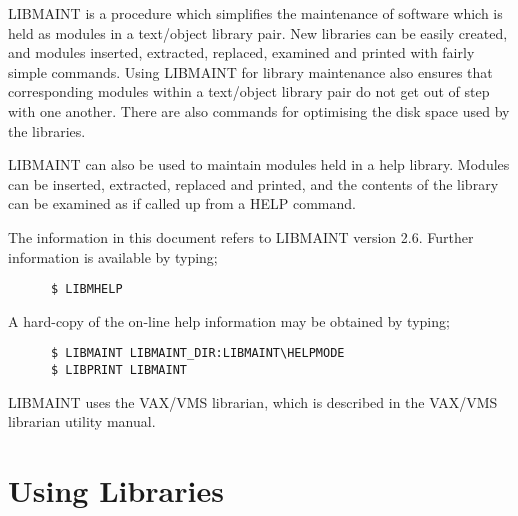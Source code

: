 LIBMAINT is a procedure which simplifies the maintenance of software
which is held as modules in a text/object library pair.
New libraries can be easily created, and modules inserted, extracted,
replaced, examined and printed with fairly simple commands.
Using LIBMAINT for library maintenance also ensures that corresponding
modules within a text/object library pair do not get out of step with
one another.
There are also commands for optimising the disk space used by the
libraries.

LIBMAINT can also be used to maintain modules held in a help library.
Modules can be inserted, extracted, replaced and printed, and the
contents of the library can be examined as if called up from a HELP
command.

The information in this document refers to LIBMAINT version 2.6.
Further information is available by typing;
\begin{verbatim}
      $ LIBMHELP
\end{verbatim}
A hard-copy of the on-line help information may be obtained by typing;
\begin{verbatim}
      $ LIBMAINT LIBMAINT_DIR:LIBMAINT\HELPMODE
      $ LIBPRINT LIBMAINT
\end{verbatim}

LIBMAINT uses the VAX/VMS librarian, which is described in the VAX/VMS
librarian utility manual.

\section{Using Libraries}

